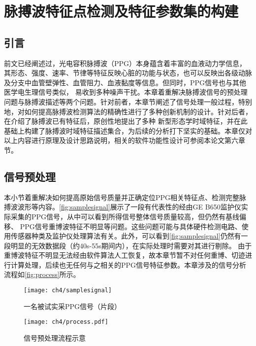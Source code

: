 \chapter{脉搏波特征点检测及特征参数集的构建}
\section{引言}
前文已经阐述过，光电容积脉搏波（PPG）本身蕴含着丰富的血液动力学信息，其形态、强度、速率、节律等特征反映心脏的功能与状态，也可以反映出各级动脉及分支中血管壁弹性、血管阻力、血液黏度等信息。但同时，PPG信号也与其他医学电生理信号类似，
易收到多种噪声干扰。本章着重解决脉搏波信号的预处理问题与脉搏波描述等两个问题。针对前者，本章节阐述了信号处理一般过程，特别地，对如何提高脉搏波检测算法的精确性进行了多种创新机制的设计。针对后者，在介绍了脉搏波已有特征后，原创性地提出了多种
新型形态学时域特征，并在此基础上构建了脉搏波时域特征描述集合，为后续的分析打下坚实的基础。本章仅对以上内容进行原理及设计思路说明，相关的软件功能性设计可参阅本论文第六章节。
\section{信号预处理}
本小节着重解决如何提高原始信号质量并正确定位PPG相关特征点、检测完整脉搏波波形等内容。\autoref{fig:samplesignal}展示了一段有代表性的经由GE B650监护仪实际采集的PPG信号，从中可以看到所得信号整体信号质量较高，但仍然有基线偏移、
PPG信号重博波特征不明显等问题。这些问题可能与具体硬件检测电路、使用传感器种类及监护仪处理算法有关。此外，可以看到\autoref{fig:samplesignal}仍然有一段明显的无效数据段（约40s-55s期间内），在实际处理时需要对其进行剔除。
由于重博波特征不明显无法经由软件算法人工恢复，故本章节暂不对任何重博、切迹进行计算处理，后续也无任何与之相关的PPG信号特征参数。本章涉及的信号分析流程如\autoref{fig:process}所示。
\begin{figure}[htbp]
    \centering
    \texttt{[image: ch4/samplesignal]}
    \caption{\label{fig:samplesignal}一名被试实采PPG信号（片段）}
\end{figure}
\begin{figure}[htbp]
    \centering
    \texttt{[image: ch4/process.pdf]}
    \caption{\label{fig:process}信号预处理流程示意}
\end{figure}

